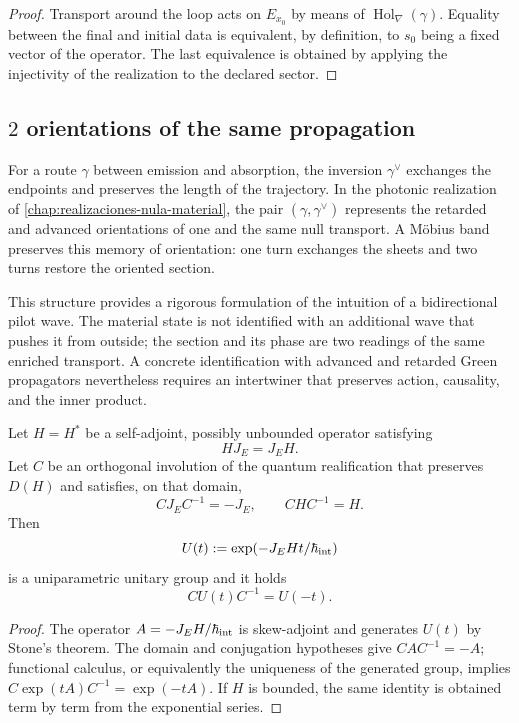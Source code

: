 \begin{proof}
Transport around the loop acts on \(E_{x_0}\) by means of
\(\operatorname{Hol}_{\nabla}(\gamma)\). Equality between the final and
initial data is equivalent, by definition, to \(s_0\) being a fixed vector of the
operator. The last equivalence is obtained by applying the injectivity of the
realization to the declared sector.
\end{proof}

\subsection{\(2\) orientations of the same propagation}

For a route \(\gamma\) between emission and absorption, the inversion
\(\gamma^\vee\) exchanges the endpoints and preserves the length of the
trajectory. In the photonic realization of
\cref{chap:realizaciones-nula-material}, the pair
\((\gamma,\gamma^\vee)\) represents the retarded and advanced orientations
of one and the same null transport. A Möbius band preserves this memory of
orientation: one turn exchanges the sheets and two turns restore the
oriented section.

This structure provides a rigorous formulation of the intuition of a
bidirectional pilot wave. The material state is not identified with an additional
wave that pushes it from outside; the section and its phase are two readings of the
same enriched transport. A concrete identification with advanced and retarded Green
propagators nevertheless requires an intertwiner that preserves action, causality,
and the inner product.

\begin{proposition}
\label{prop:conjugacion-propagador-bidireccional-rev2}
Let \(H=H^*\) be a self-adjoint, possibly unbounded operator satisfying
\[
 HJ_E=J_EH.
\]
Let \(C\) be an orthogonal involution of the quantum realification that preserves
\(D(H)\) and satisfies, on that domain,
\[
 CJ_EC^{-1}=-J_E,
 \qquad CHC^{-1}=H.
\]
Then
\[
 U(t):=\exp(-J_EHt/\hbar_{\rm int})
\]
is a uniparametric unitary group and it holds
\[
 \boxed{CU(t)C^{-1}=U(-t)}.
\]
\end{proposition}

\begin{proof}
The operator \(A=-J_EH/\hbar_{\rm int}\) is skew-adjoint and generates \(U(t)\)
by Stone's theorem. The domain and conjugation hypotheses give
\(CAC^{-1}=-A\); functional calculus, or equivalently the uniqueness of the
generated group, implies
\(C\exp(tA)C^{-1}=\exp(-tA)\). If \(H\) is bounded, the same identity is
obtained term by term from the exponential series.
\end{proof}

